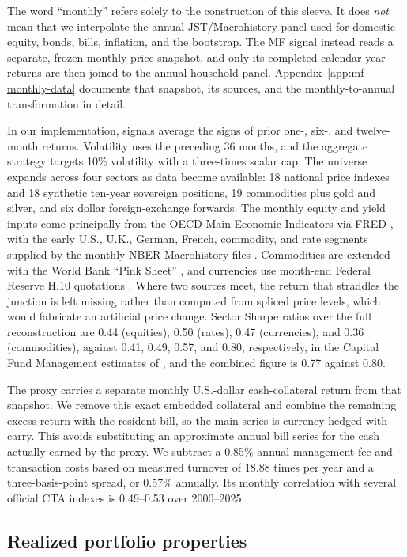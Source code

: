 \documentclass[11pt]{article}
\begin{document}
The word ``monthly'' refers solely to the construction of this sleeve. It
does \emph{not} mean that we interpolate the annual JST/Macrohistory panel
used for domestic equity, bonds, bills, inflation, and the bootstrap. The MF
signal instead reads a separate, frozen monthly price snapshot, and only its
completed calendar-year returns are then joined to the annual household panel.
Appendix~\ref{app:mf-monthly-data} documents that snapshot, its sources, and
the monthly-to-annual transformation in detail.

In our implementation, signals average the signs of prior one-, six-, and
twelve-month returns. Volatility uses the preceding 36 months, and the aggregate
strategy targets 10\% volatility with a three-times scalar cap. The universe
expands across four sectors as data become available: 18 national price indexes
and 18 synthetic ten-year sovereign positions, 19 commodities plus gold and
silver, and six dollar foreign-exchange forwards. The monthly equity and yield
inputs come principally from the OECD Main Economic Indicators via FRED
\citep{OECDMEI,FRED}, with the early U.S., U.K., German, French, commodity, and
rate segments supplied by the monthly NBER Macrohistory files
\citep{NBERMacrohistory}. Commodities are extended with the World Bank ``Pink
Sheet'' \citep{WorldBankPinkSheet}, and currencies use month-end Federal
Reserve H.10 quotations \citep{FedH10}. Where two sources meet, the return
that straddles the junction is left missing rather than computed from spliced
price levels, which would fabricate an artificial price change. Sector Sharpe ratios over
the full reconstruction are 0.44 (equities), 0.50 (rates), 0.47 (currencies),
and 0.36 (commodities), against 0.41, 0.49, 0.57, and 0.80, respectively, in the
Capital Fund Management estimates of \citet{LempiereEtAl2014}, and the combined
figure is 0.77 against 0.80.

The proxy carries a separate monthly U.S.-dollar cash-collateral return from
that snapshot. We remove this exact embedded collateral and combine the
remaining excess return with the resident bill, so the main series is
currency-hedged with carry. This avoids substituting an approximate annual bill
series for the cash actually earned by the proxy.
We subtract a 0.85\% annual management
fee and transaction costs based on measured turnover of 18.88 times per year
and a three-basis-point spread, or 0.57\% annually. Its monthly correlation with
several official CTA indexes is 0.49--0.53 over 2000--2025.

\subsection{Realized portfolio properties}
\end{document}
